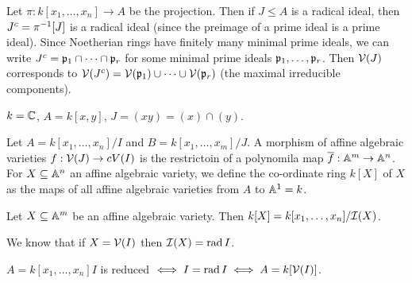 Let $\pi: k[x_1,\ldots,x_n] \to A$ be the projection.
Then if $J \leq A$ is a radical ideal, then $J^c = \pi^{-1}[J]$ is a radical ideal (since the preimage of a prime ideal is a prime ideal).
Since Noetherian rings have finitely many minimal prime ideals, we can write $J^c = \mathfrak{p}_1 \cap \cdots \cap \mathfrak{p}_r$ for some minimal prime ideals $\mathfrak{p}_1,\ldots,\mathfrak{p}_r$.
Then $\mathcal{V}(J)$ corresponds to $\mathcal{V}(J^c) = \mathcal{V}(\mathfrak{p}_1) \cup \cdots \cup \mathcal{V}(\mathfrak{p}_r)$ (the maximal irreducible components).

\begin{exam}
  $k=\mathbb{C}$, $A=k[x,y]$, $J=(xy) = (x) \cap (y)$.
\end{exam}

\begin{defn}[AG.13]
  Let $A=k[x_1,\ldots,x_n]/I$ and $B=k[x_1,\ldots,x_m]/J$.
  A morphism of affine algebraic varieties $f: \mathcal{V}(J) \to cV(I)$ is the restrictoin of a polynomila map $\overline f: \mathbb{A}^m \to \mathbb{A}^n$.
  For $X \subseteq \mathbb{A}^n$ an affine algebraic variety, we define the co-ordinate ring $k[X]$ of $X$ as the maps of all affine algebraic varieties from $A$ to $\mathbb{A}^1 = k$.
\end{defn}

\begin{prop}[AG.14]
  Let $X \subseteq \mathbb{A}^m$ be an affine algebraic variety.
  Then $k[X] = k[x_1,\ldots,x_n]/\mathcal{I}(X)$.
\end{prop}

We know that if $X = \mathcal{V}(I)$ then $\mathcal{I}(X) = \operatorname{rad} I$.
\
\begin{rmk}
  $A = k[x_1,\ldots,x_n]I$ is reduced $\iff I = \operatorname{rad} I \iff A = k[\mathcal{V}(I)]$.
\end{rmk}
